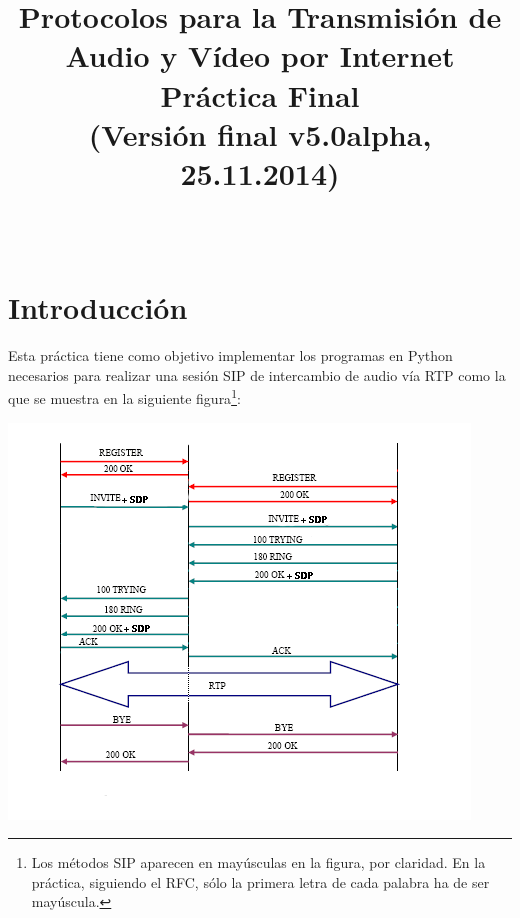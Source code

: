 \documentclass[a4paper,11pt]{article}
\begin{document}
\title{Protocolos para la Transmisión de Audio y Vídeo por Internet\\ 
Práctica Final \\
(Versión final v5.0alpha, 25.11.2014) \\
\ \\
}

\maketitle
\thispagestyle{empty}
\tableofcontents
\newpage


\section{Introducción}

Esta práctica tiene como objetivo implementar los programas en Python 
necesarios para realizar una sesión SIP de intercambio de audio vía RTP
como la que se muestra en la siguiente figura\footnote{Los métodos SIP
aparecen en mayúsculas en la figura, por claridad. En la práctica, siguiendo
el RFC, sólo la primera letra de cada palabra ha de ser mayúscula.}:

\begin{center}
\includegraphics{figs/complete-sip-session.png}
\end{center}
\end{document}
